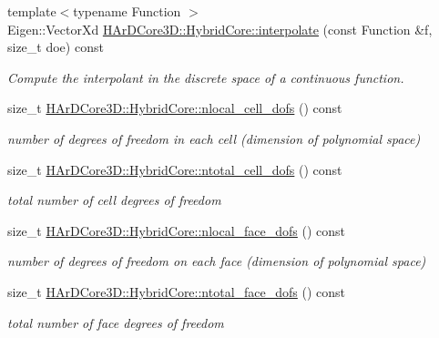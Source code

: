 \begin{DoxyCompactItemize}
{\footnotesize template$<$typename Function $>$ }\\Eigen\+::\+Vector\+Xd \hyperlink{group__HybridCore_gaa1c3baf0764f3f160759e0ffc8969dfb}{H\+Ar\+D\+Core3\+D\+::\+Hybrid\+Core\+::interpolate} (const Function \&f, size\+\_\+t doe) const
\begin{DoxyCompactList}\small\item\em Compute the interpolant in the discrete space of a continuous function. \end{DoxyCompactList}\item 
\mbox{\label{group__HybridCore_ga228678f9bf8057025f3c220e40cab209}} 
size\+\_\+t \hyperlink{group__HybridCore_ga228678f9bf8057025f3c220e40cab209}{H\+Ar\+D\+Core3\+D\+::\+Hybrid\+Core\+::nlocal\+\_\+cell\+\_\+dofs} () const
\begin{DoxyCompactList}\small\item\em number of degrees of freedom in each cell (dimension of polynomial space) \end{DoxyCompactList}\item 
\mbox{\label{group__HybridCore_gaae30736925e857cb467c3f5c75fdc97e}} 
size\+\_\+t \hyperlink{group__HybridCore_gaae30736925e857cb467c3f5c75fdc97e}{H\+Ar\+D\+Core3\+D\+::\+Hybrid\+Core\+::ntotal\+\_\+cell\+\_\+dofs} () const
\begin{DoxyCompactList}\small\item\em total number of cell degrees of freedom \end{DoxyCompactList}\item 
\mbox{\label{group__HybridCore_ga94fa97198237f40a378a384f3d072394}} 
size\+\_\+t \hyperlink{group__HybridCore_ga94fa97198237f40a378a384f3d072394}{H\+Ar\+D\+Core3\+D\+::\+Hybrid\+Core\+::nlocal\+\_\+face\+\_\+dofs} () const
\begin{DoxyCompactList}\small\item\em number of degrees of freedom on each face (dimension of polynomial space) \end{DoxyCompactList}\item 
\mbox{\label{group__HybridCore_gab2e20ded434d1aacc44927934faabc1c}} 
size\+\_\+t \hyperlink{group__HybridCore_gab2e20ded434d1aacc44927934faabc1c}{H\+Ar\+D\+Core3\+D\+::\+Hybrid\+Core\+::ntotal\+\_\+face\+\_\+dofs} () const
\begin{DoxyCompactList}\small\item\em total number of face degrees of freedom \end{DoxyCompactList}\item 

\end{DoxyCompactItemize}
